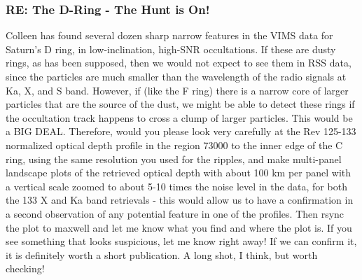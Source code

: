 \documentclass[crop=false,class=article,oneside]{standalone}
\begin{document}
\subsubsection{\footnotesize RE: The D-Ring - The Hunt is On!}
Colleen has found several dozen sharp narrow features in the VIMS data for Saturn's D ring, in low-inclination, high-SNR occultations. If these are dusty rings, as has been supposed, then we would not expect to see them in RSS data, since the particles are much smaller than the wavelength of the radio signals at Ka, X, and S band. However, if (like the F ring) there is a narrow core of larger particles that are the source of the dust, we might be able to detect these rings if the occultation track happens to cross a clump of larger particles. This would be a BIG DEAL. Therefore, would you please look very carefully at the Rev 125-133 normalized optical depth profile in the region 73000 to the inner edge of the C ring, using the same resolution you used for the ripples, and make multi-panel landscape plots of the retrieved optical depth with about 100 km per panel with a vertical scale zoomed to about 5-10 times the noise level in the data, for both the 133 X and Ka band retrievals - this would allow us to have a confirmation in a second observation of any potential feature in one of the profiles. Then rsync the plot to maxwell and let me know what you find and where the plot is. If you see something that looks suspicious, let me know right away! If we can confirm it, it is definitely worth a short publication. A long shot, I think, but worth checking!
\end{document}
